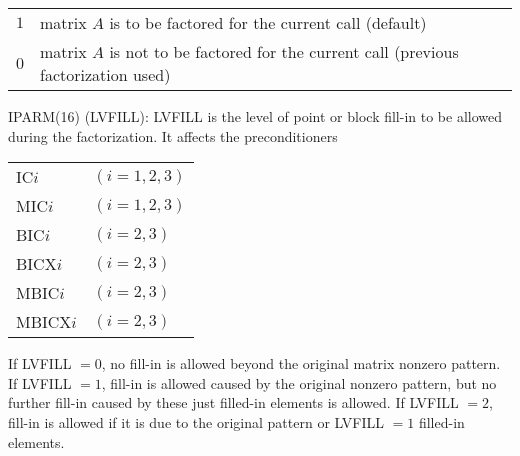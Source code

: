 \begin{list}{}{
               \leftmargin 1.00in \rightmargin 0.25in}
         \begin{tabular}{ll}
            $1$ & matrix $A$ is to be factored for the current call 
                  (default) \\
            $0$ & matrix $A$ is not to be factored for the current
                  call (previous factorization used)
         \end{tabular}
 
 
\item[IPARM(16) \hfill](LVFILL):
         LVFILL is the level of point or block fill-in to be allowed
         during the factorization.  It affects the preconditioners
 
         \begin{tabular}{ll}
            IC$i$       &   $(i = 1,2,3)$  \\
            MIC$i$      &   $(i = 1,2,3)$  \\
            BIC$i$      &   $(i = 2,3)$    \\
            BICX$i$     &   $(i = 2,3)$    \\
            MBIC$i$     &   $(i = 2,3)$    \\
            MBICX$i$    &   $(i = 2,3)$
         \end{tabular}
 
         If LVFILL $= 0$, no fill-in
         is allowed beyond the original matrix nonzero pattern.  If
         LVFILL $= 1$, fill-in is allowed caused by the original
         nonzero pattern, but no further fill-in caused by these just
         filled-in elements is allowed.  If LVFILL $= 2$, fill-in is
         allowed if it is due to the original pattern or LVFILL $= 1$
         filled-in elements.
 

\end{list}
